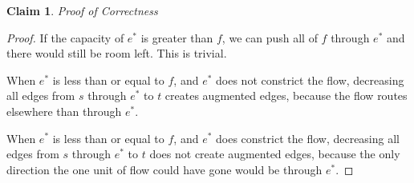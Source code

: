 \documentclass[11pt]{article}
\newtheorem{claim}[theorem]{Claim}
\begin{document}
	\begin{claim}
	Proof of Correctness
\end{claim}

\begin{proof}
	If the capacity of $e^*$ is greater than $f$, we can push all of $f$ through $e^*$ and there would still be room left. This is trivial.

	When $e^*$ is less than or equal to $f$, and $e^*$ does not constrict the flow, decreasing all edges from $s$ through $e^*$ to $t$ creates augmented edges, because the flow routes elsewhere than through $e^*$.

	When $e^*$ is less than or equal to $f$, and $e^*$ does constrict the flow, decreasing all edges from $s$ through $e^*$ to $t$ does not create augmented edges, because the only direction the one unit of flow could have gone would be through $e^*$. 
\end{proof}

	\newpage
\end{document}
